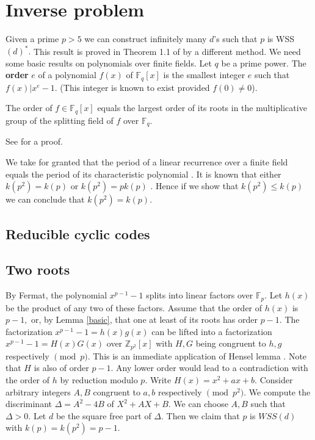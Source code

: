 \documentclass[12pt,reqno]{amsart}
\newcommand{\F}{\mathbb{F}}
\newcommand{\Z}{\mathbb{Z}}
\begin{document}
\section{ Inverse problem} \label{sec:inv-prob}
Given a prime $p>5$ we can construct infinitely many $d$'s such that $p$ is WSS$(d)^*.$ This result is proved  in Theorem 1.1 of \cite{QS} by a different method. We need some basic results on polynomials over finite fields. Let $q$ be a prime power. The {\bf order} $e$ of a polynomial $f(x)$ of
$\F_q[x]$ is the smallest integer $e$ such that
$f(x) | x^e-1.$ (This integer is known to exist provided $f(0)\neq 0$).

{\lem \label{basic} The order of $f\in \F_q[x]$ equals the largest order of its roots in the multiplicative group of the splitting field of $f$ over $\F_q.$}

See \cite[Th. 8.27]{LN} for a proof.

We take for granted that the period of a linear recurrence over a finite field equals the period of its characteristic polynomial \cite[Th. 8.28, p.408]{LN}.
It is known that either $k(p^2)=k(p)$ or $k(p^2)=p k(p)$ \cite[Prop. 1, p. 375]{R}. Hence if we show that
$k(p^2)\le k(p)$ we can conclude that $k(p^2)=k(p).$

\subsection{Reducible cyclic codes}
\subsection{Two roots} \label{sec-order-p-1}
By Fermat, the polynomial $x^{p-1}-1$ splits into linear factors over $\F_p.$ Let $h(x)$ be the product of any two of these factors. Assume that the order of $h(x)$ is $p-1,$
or, by Lemma \ref{basic}, that one at least of its roots has order $p-1.$
The factorization $x^{p-1}-1=h(x)g(x)$ can be lifted into a factorization $x^{p-1}-1=H(x)G(x)$ over $\Z_{p^2}[x]$ with $H,G$ being congruent to $h,g$ respectively
$\pmod{p}.$ This is an immediate application of Hensel lemma \cite{McG}. Note that $H$ is also of order $p-1.$
Any lower order would lead to a contradiction with the order of $h$ by reduction modulo $p.$
Write $H(x)=x^2+ax+b.$ Consider arbitrary integers $A,B$ congruent to $a,b$ respectively $ \pmod{p^2}.$ We compute the discriminant $\Delta=A^2-4B$ of
$X^2+AX+B.$
We can choose $A,B$ such that
$\Delta>0.$
Let $d$ be the square free part of $\Delta.$ Then we claim that $p$ is $WSS(d)$ with $k(p)=k(p^2)=p-1.$
\end{document}
